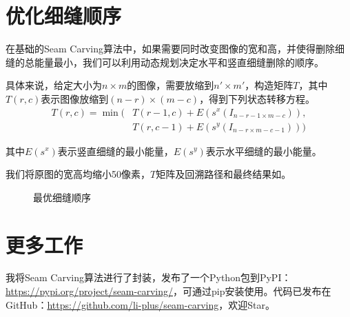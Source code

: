\documentclass[11pt,a4paper]{article}
\begin{document}
\section{优化细缝顺序}

在基础的Seam Carving算法中，如果需要同时改变图像的宽和高，并使得删除细缝的总能量最小，我们可以利用动态规划决定水平和竖直细缝删除的顺序。

具体来说，给定大小为$n\times m$的图像，需要放缩到$n'\times m'$，构造矩阵$T$，其中$T(r,c)$表示图像放缩到$(n-r)\times (m-c)$，得到下列状态转移方程。
\begin{equation}
    \begin{split}
        T(r,c) = \min(&T(r-1,c)+E(s^x(I_{n-r-1\times m-c})),\\
        &T(r,c-1)+E(s^y(I_{n-r\times m-c-1})))
    \end{split}
\end{equation}

其中$E(s^x)$表示竖直细缝的最小能量，$E(s^y)$表示水平细缝的最小能量。

我们将原图的宽高均缩小50像素，$T$矩阵及回溯路径和最终结果如。

\begin{figure}[H]
    \centering
    \caption{最优细缝顺序}
    \label{fig:opt_seam_order}
\end{figure}

\section{更多工作}

我将Seam Carving算法进行了封装，发布了一个Python包到PyPI：\url{https://pypi.org/project/seam-carving/}，可通过pip安装使用。代码已发布在GitHub：\url{https://github.com/li-plus/seam-carving}，欢迎Star。



\end{document}
